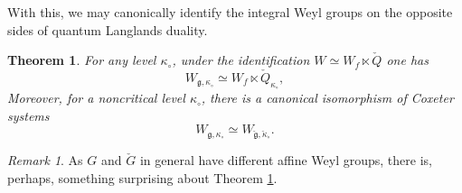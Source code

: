 \documentclass[11pt,reqno]{amsart}
\newcommand{\fg}{\mathfrak{g}}
\newtheorem{theo}[subsubsection]{Theorem}
\theoremstyle{remark}
\newtheorem{re}[subsubsection]{Remark}
\numberwithin{equation}{section}
\begin{document}
\subsubsection{}
With this, we may canonically identify the integral Weyl groups on the opposite 
sides of quantum Langlands duality. 

\begin{theo}\label{t:intw} For any level $\kappa_\circ$, under the 
identification $W \simeq W_f \ltimes \check{Q}$ one has
\begin{equation} \label{e:subafw}
W_{\fg, \kappa_\circ} \simeq W_f \ltimes \check{Q}_{\kappa_\circ},
\end{equation}
%
	 Moreover, for a noncritical 
	level $\kappa_\circ$, there is a canonical isomorphism of Coxeter systems
	\begin{equation}\label{e:coxeq2} W_{\fg, \kappa_\circ} \simeq 
	W_{\check{\fg}, 
		\check{\kappa}_\circ}.
	\end{equation}
\end{theo} 


\begin{re}
As $G$ and $\check{G}$ in general have different 
affine Weyl groups, there is, perhaps, something surprising about 
Theorem \ref{t:intw}. 
\end{re}
\end{document}
